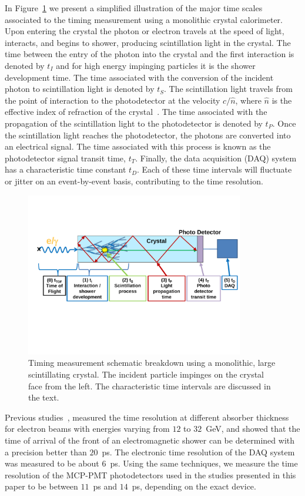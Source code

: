 In Figure~\ref{fig:ScintillatorTiming} we present a simplified illustration of
the major time scales associated to the timing measurement using a monolithic
crystal calorimeter. Upon entering the crystal the photon or electron travels
at the speed of light, interacts, and begins to shower, producing scintillation light in the crystal. 
The time between the entry of the photon into the crystal and the first interaction is denoted by
$t_I$ and for high energy impinging particles it is the shower development time. 
The time associated with the conversion of the incident photon to
scintillation light is denoted by $t_S$. The scintillation light travels from
the point of interaction to the photodetector at the velocity $c/\hat{n}$, where
$\hat{n}$ is the effective index of refraction of the crystal~\cite{Moses}. The
time associated with the propagation of the scintillation light to the photodetector 
is denoted by $t_P$. Once the scintillation light reaches the photodetector, the  photons 
are converted into an electrical signal. The time associated with this process is known as the
photodetector signal transit time, $t_T$. Finally, the data acquisition (DAQ)
system has a characteristic time constant $t_D$. Each of these time intervals will fluctuate or 
jitter on an event-by-event basis, contributing to the time resolution.
\begin{figure}[h] \centering
\includegraphics[width=0.85\textwidth]{figs/ScintillatorTiming_v4}
\caption{\small Timing measurement schematic breakdown using a monolithic, large scintillating crystal. 
The incident particle impinges on the crystal face from the left. The characteristic time intervals  are discussed 
in the text.}
\label{fig:ScintillatorTiming}
\end{figure}
Previous studies~\cite{MCPFastCaloNIMA}, measured the time resolution at different
absorber thickness for electron beams with energies varying from $12$ to
$32$~GeV, and showed that the time of arrival of the front of an electromagnetic
shower can be determined with a precision better than $20$~ps. The electronic
time resolution of the DAQ system was measured to be about $6$~ps. Using
the same techniques, we measure the time resolution of the MCP-PMT photodetectors 
used in the studies presented in this paper  to be between $11$~ps and $14$~ps, depending 
on the exact device.

